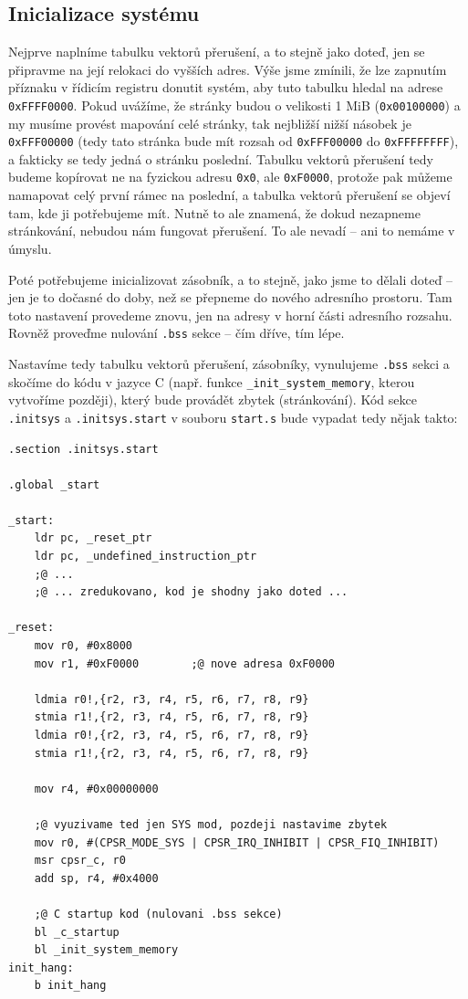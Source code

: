 \documentclass{article}
\begin{document}

\subsection{Inicializace systému}

Nejprve naplníme tabulku vektorů přerušení, a to stejně jako doteď, jen se připravme na její relokaci do vyšších adres. Výše jsme zmínili, že lze zapnutím příznaku v řídicím registru donutit systém, aby tuto tabulku hledal na adrese {\tt 0xFFFF0000}. Pokud uvážíme, že stránky budou o velikosti 1 MiB ({\tt 0x00100000}) a my musíme provést mapování celé stránky, tak nejbližší nižší násobek je {\tt 0xFFF00000} (tedy tato stránka bude mít rozsah od {\tt 0xFFF00000} do {\tt 0xFFFFFFFF}), a fakticky se tedy jedná o stránku poslední. Tabulku vektorů přerušení tedy budeme kopírovat ne na fyzickou adresu {\tt 0x0}, ale {\tt 0xF0000}, protože pak můžeme namapovat celý první rámec na poslední, a tabulka vektorů přerušení se objeví tam, kde ji potřebujeme mít. Nutně to ale znamená, že dokud nezapneme stránkování, nebudou nám fungovat přerušení. To ale nevadí -- ani to nemáme v úmyslu.

Poté potřebujeme inicializovat zásobník, a to stejně, jako jsme to dělali doteď -- jen je to dočasné do doby, než se přepneme do nového adresního prostoru. Tam toto nastavení provedeme znovu, jen na adresy v horní části adresního rozsahu. Rovněž proveďme nulování {\tt .bss} sekce -- čím dříve, tím lépe.

Nastavíme tedy tabulku vektorů přerušení, zásobníky, vynulujeme {\tt .bss} sekci a skočíme do kódu v jazyce C (např. funkce {\tt \_init\_system\_memory}, kterou vytvoříme později), který bude provádět zbytek (stránkování). Kód sekce {\tt .initsys} a {\tt .initsys.start} v souboru {\tt start.s} bude vypadat tedy nějak takto:
\begin{lstlisting}
.section .initsys.start

.global _start

_start:
    ldr pc, _reset_ptr
    ldr pc, _undefined_instruction_ptr
    ;@ ...    
    ;@ ... zredukovano, kod je shodny jako doted ...

_reset:
    mov r0, #0x8000
    mov r1, #0xF0000        ;@ nove adresa 0xF0000

    ldmia r0!,{r2, r3, r4, r5, r6, r7, r8, r9}
    stmia r1!,{r2, r3, r4, r5, r6, r7, r8, r9}
    ldmia r0!,{r2, r3, r4, r5, r6, r7, r8, r9}
    stmia r1!,{r2, r3, r4, r5, r6, r7, r8, r9}

    mov r4, #0x00000000

    ;@ vyuzivame ted jen SYS mod, pozdeji nastavime zbytek
    mov r0, #(CPSR_MODE_SYS | CPSR_IRQ_INHIBIT | CPSR_FIQ_INHIBIT)
    msr cpsr_c, r0
    add sp, r4, #0x4000

    ;@ C startup kod (nulovani .bss sekce)
    bl _c_startup
    bl _init_system_memory
init_hang:
    b init_hang
\end{lstlisting}
\end{document}
